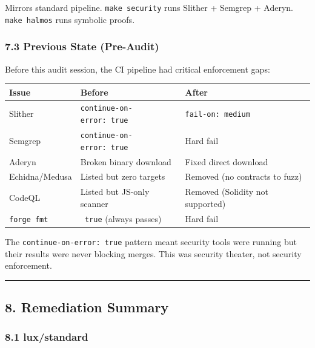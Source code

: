 \documentclass[
]{article}
\newcounter{none} %
\begin{document}
Mirrors standard pipeline. \texttt{make\ security} runs Slither +
Semgrep + Aderyn. \texttt{make\ halmos} runs symbolic proofs.

\subsubsection{7.3 Previous State
(Pre-Audit)}\label{73-previous-state-pre-audit}

Before this audit session, the CI pipeline had critical enforcement
gaps:

{\def\LTcaptype{none} %
\begin{longtable}[]{@{}lll@{}}
\toprule\noalign{}
Issue & Before & After \\
\midrule\noalign{}
\endhead
\bottomrule\noalign{}
\endlastfoot
Slither & \texttt{continue-on-error:\ true} &
\texttt{fail-on:\ medium} \\
Semgrep & \texttt{continue-on-error:\ true} & Hard fail \\
Aderyn & Broken binary download & Fixed direct download \\
Echidna/Medusa & Listed but zero targets & Removed (no contracts to
fuzz) \\
CodeQL & Listed but JS-only scanner & Removed (Solidity not
supported) \\
\texttt{forge\ fmt} & \texttt{\textbar{}\textbar{}\ true} (always
passes) & Hard fail \\
\end{longtable}
}

The \texttt{continue-on-error:\ true} pattern meant security tools were
running but their results were never blocking merges. This was security
theater, not security enforcement.

\begin{center}\rule{0.5\linewidth}{0.5pt}\end{center}

\subsection{8. Remediation Summary}\label{8-remediation-summary}

\subsubsection{8.1 lux/standard}\label{81-luxstandard}
\end{document}
